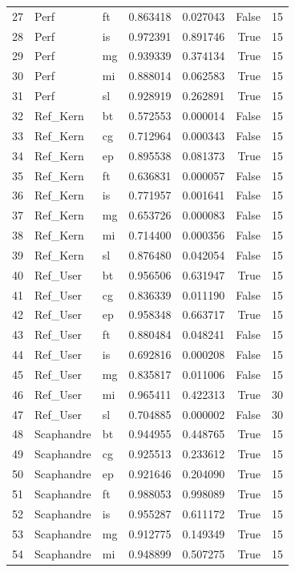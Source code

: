 \begin{tabular}{lllrrrr}
27 & Perf & ft & 0.863418 & 0.027043 & False & 15 \\
28 & Perf & is & 0.972391 & 0.891746 & True & 15 \\
29 & Perf & mg & 0.939339 & 0.374134 & True & 15 \\
30 & Perf & mi & 0.888014 & 0.062583 & True & 15 \\
31 & Perf & sl & 0.928919 & 0.262891 & True & 15 \\
32 & Ref_Kern & bt & 0.572553 & 0.000014 & False & 15 \\
33 & Ref_Kern & cg & 0.712964 & 0.000343 & False & 15 \\
34 & Ref_Kern & ep & 0.895538 & 0.081373 & True & 15 \\
35 & Ref_Kern & ft & 0.636831 & 0.000057 & False & 15 \\
36 & Ref_Kern & is & 0.771957 & 0.001641 & False & 15 \\
37 & Ref_Kern & mg & 0.653726 & 0.000083 & False & 15 \\
38 & Ref_Kern & mi & 0.714400 & 0.000356 & False & 15 \\
39 & Ref_Kern & sl & 0.876480 & 0.042054 & False & 15 \\
40 & Ref_User & bt & 0.956506 & 0.631947 & True & 15 \\
41 & Ref_User & cg & 0.836339 & 0.011190 & False & 15 \\
42 & Ref_User & ep & 0.958348 & 0.663717 & True & 15 \\
43 & Ref_User & ft & 0.880484 & 0.048241 & False & 15 \\
44 & Ref_User & is & 0.692816 & 0.000208 & False & 15 \\
45 & Ref_User & mg & 0.835817 & 0.011006 & False & 15 \\
46 & Ref_User & mi & 0.965411 & 0.422313 & True & 30 \\
47 & Ref_User & sl & 0.704885 & 0.000002 & False & 30 \\
48 & Scaphandre & bt & 0.944955 & 0.448765 & True & 15 \\
49 & Scaphandre & cg & 0.925513 & 0.233612 & True & 15 \\
50 & Scaphandre & ep & 0.921646 & 0.204090 & True & 15 \\
51 & Scaphandre & ft & 0.988053 & 0.998089 & True & 15 \\
52 & Scaphandre & is & 0.955287 & 0.611172 & True & 15 \\
53 & Scaphandre & mg & 0.912775 & 0.149349 & True & 15 \\
54 & Scaphandre & mi & 0.948899 & 0.507275 & True & 15 \\

\end{tabular}
